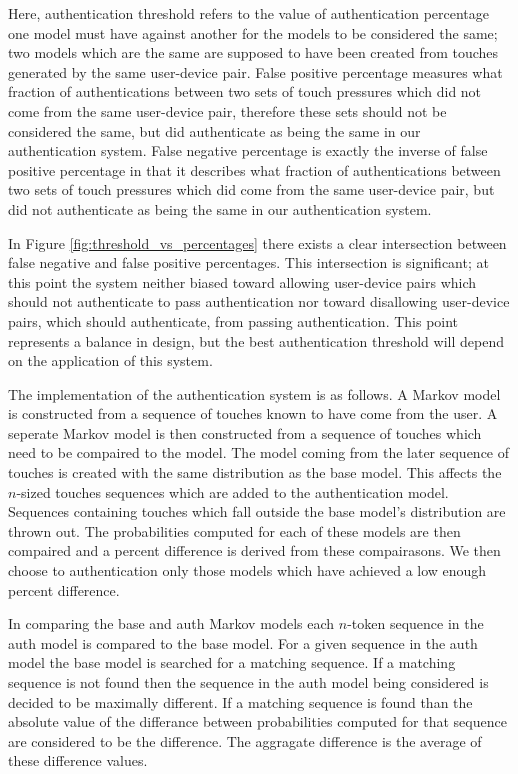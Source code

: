 \documentclass{acm_proc_article-sp}
\begin{document}
Here, authentication threshold refers to the value of authentication percentage one model must have against another for the models to be considered the same; two models which are the same are supposed to have been created from touches generated by the same user-device pair.
False positive percentage measures what fraction of authentications between two sets of touch pressures which did not come from the same user-device pair, therefore these sets should not be considered the same, but did authenticate as being the same in our authentication system.
False negative percentage is exactly the inverse of false positive percentage in that it describes what fraction of authentications between two sets of touch pressures which did come from the same user-device pair, but did not authenticate as being the same in our authentication system.

In Figure \ref{fig:threshold_vs_percentages} there exists a clear intersection between false negative and false positive percentages. This intersection is significant; at this point the system neither biased toward allowing user-device pairs which should not authenticate to pass authentication nor toward disallowing user-device pairs, which should authenticate, from passing authentication. This point represents a balance in design, but the best authentication threshold will depend on the application of this system.

The implementation of the authentication system is as follows. A Markov model is constructed from a sequence of touches known to have come from the user. A seperate Markov model is then constructed from a sequence of touches which need to be compaired to the model.
The model coming from the later sequence of touches is created with the same distribution as the base model. This affects the $n$-sized touches sequences which are added to the authentication model.
Sequences containing touches which fall outside the base model's distribution are thrown out.
The probabilities computed for each of these models are then compaired and a percent difference is derived from these compairasons. We then choose to authentication only those models which have achieved a low enough percent difference.

In comparing the base and auth Markov models each $n$-token sequence in the auth model is compared to the base model.
For a given sequence in the auth model the base model is searched for a matching sequence.
If a matching sequence is not found then the sequence in the auth model being considered is decided to be maximally different.
If a matching sequence is found than the absolute value of the differance between probabilities computed for that sequence are considered to be the difference.
The aggragate difference is the average of these difference values.  
\end{document}
